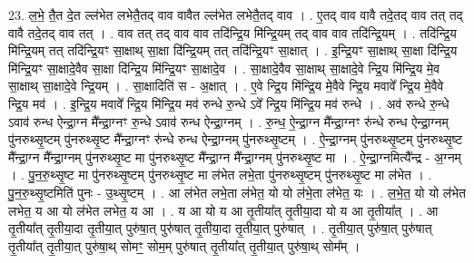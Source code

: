 \documentclass[17pt]{extarticle}
\begin{document}
23. ल॒भे॒ तै॒त दे॒त ल्ल॑भेत लभेतै॒तद् वाव वावैत ल्ल॑भेत लभेतै॒तद् वाव । . ए॒तद् वाव वावै तदे॒तद् वाव तत् तद् वावै तदे॒तद् वाव तत् । . वाव तत् तद् वाव वाव तदि॑न्द्रि॒य मि॑न्द्रि॒यम् तद् वाव वाव तदि॑न्द्रि॒यम् । . तदि॑न्द्रि॒य मि॑न्द्रि॒यम् तत् तदि॑न्द्रि॒यꣳ सा॒क्षाथ् सा॒क्षा दि॑न्द्रि॒यम् तत् तदि॑न्द्रि॒यꣳ सा॒क्षात् । . इ॒न्द्रि॒यꣳ सा॒क्षाथ् सा॒क्षा दि॑न्द्रि॒य मि॑न्द्रि॒यꣳ सा॒क्षादे॒वैव सा॒क्षा दि॑न्द्रि॒य मि॑न्द्रि॒यꣳ सा॒क्षादे॒व । . सा॒क्षादे॒वैव सा॒क्षाथ् सा॒क्षादे॒वे न्द्रि॒य मि॑न्द्रि॒य मे॒व सा॒क्षाथ् सा॒क्षादे॒वे न्द्रि॒यम् । . सा॒क्षादिति॑ स - अ॒क्षात् । . ए॒वे न्द्रि॒य मि॑न्द्रि॒य मे॒वैवे न्द्रि॒य मवावे᳚ न्द्रि॒य मे॒वैवे न्द्रि॒य मव॑ । . इ॒न्द्रि॒य मवावे᳚ न्द्रि॒य मि॑न्द्रि॒य मव॑ रुन्धे रु॒न्धे ऽवे᳚ न्द्रि॒य मि॑न्द्रि॒य मव॑ रुन्धे । . अव॑ रुन्धे रु॒न्धे ऽवाव॑ रुन्ध ऐन्द्रा॒ग्न मै᳚न्द्रा॒ग्नꣳ रु॒न्धे ऽवाव॑ रुन्ध ऐन्द्रा॒ग्नम् । . रु॒न्ध॒ ऐ॒न्द्रा॒ग्न मै᳚न्द्रा॒ग्नꣳ रु॑न्धे रुन्ध ऐन्द्रा॒ग्नम् पु॑नरुथ्सृ॒ष्टम् पु॑नरुथ्सृ॒ष्ट मै᳚न्द्रा॒ग्नꣳ रु॑न्धे रुन्ध ऐन्द्रा॒ग्नम् पु॑नरुथ्सृ॒ष्टम् । . ऐ॒न्द्रा॒ग्नम् पु॑नरुथ्सृ॒ष्टम् पु॑नरुथ्सृ॒ष्ट मै᳚न्द्रा॒ग्न मै᳚न्द्रा॒ग्नम् पु॑नरुथ्सृ॒ष्ट मा पु॑नरुथ्सृ॒ष्ट मै᳚न्द्रा॒ग्न मै᳚न्द्रा॒ग्नम् पु॑नरुथ्सृ॒ष्ट मा । . ऐ॒न्द्रा॒ग्नमित्यै᳚न्द्र - अ॒ग्नम् । . पु॒न॒रु॒थ्सृ॒ष्ट मा पु॑नरुथ्सृ॒ष्टम् पु॑नरुथ्सृ॒ष्ट मा ल॑भेत लभे॒ता पु॑नरुथ्सृ॒ष्टम् पु॑नरुथ्सृ॒ष्ट मा ल॑भेत । . पु॒न॒रु॒थ्सृ॒ष्टमिति॑ पुनः - उ॒थ्सृ॒ष्टम् । . आ ल॑भेत लभे॒ता ल॑भेत॒ यो यो ल॑भे॒ता ल॑भेत॒ यः । . ल॒भे॒त॒ यो यो ल॑भेत लभेत॒ य आ यो ल॑भेत लभेत॒ य आ । . य आ यो य आ तृ॒तीया᳚त् तृ॒तीया॒दा यो य आ तृ॒तीया᳚त् । . आ तृ॒तीया᳚त् तृ॒तीया॒दा तृ॒तीया॒त् पुरु॑षा॒त् पुरु॑षात् तृ॒तीया॒दा तृ॒तीया॒त् पुरु॑षात् । . तृ॒तीया॒त् पुरु॑षा॒त् पुरु॑षात् तृ॒तीया᳚त् तृ॒तीया॒त् पुरु॑षा॒थ् सोमꣳ॒॒ सोम॒म् पुरु॑षात् तृ॒तीया᳚त् तृ॒तीया॒त् पुरु॑षा॒थ् सोम᳚म् । \newline
\end{document}
